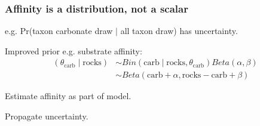 \documentclass{beamer}
\begin{document}
\begin{frame}
  \frametitle{Affinity is a distribution, not a scalar}

  e.g. Pr(taxon carbonate draw \(\mid\) all taxon draw) has uncertainty.

  Improved prior e.g. substrate affinity:
  \begin{align*}
    (\theta_{\text{carb}} \mid \text{rocks}) &\sim Bin(\text{carb} \mid \text{rocks}, \theta_{\text{carb}}) Beta(\alpha, \beta) \\
    &\sim Beta(\text{carb} + \alpha, \text{rocks} - \text{carb} + \beta)
  \end{align*}

  Estimate affinity as part of model. 
  
  Propagate uncertainty.

\end{frame}
\end{document}

